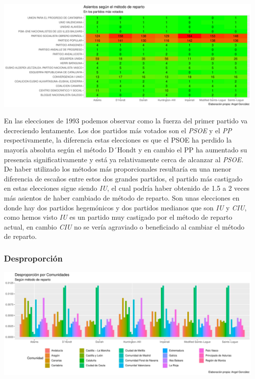 \documentclass[12pt,a4paper,]{book}
\numberwithin{dummy}{section}
\theoremstyle{ocrenumbox}
\theoremstyle{blacknumex}
\theoremstyle{blacknumbox}
\theoremstyle{ocrenum}
\theoremstyle{ocrenum}
\begin{document}
\begin{center}\includegraphics[width=0.95\linewidth]{figurasR/unnamed-chunk-107-2} \end{center}

En las elecciones de 1993 podemos observar como la fuerza del primer
partido va decreciendo lentamente. Los dos partidos más votados son el
\emph{PSOE} y el \emph{PP} respectivamente, la diferencia estas
elecciones es que el PSOE ha perdido la mayoría absoluta según el método
D´Hondt y en cambio el PP ha aumentado su presencia significativamente y
está ya relativamente cerca de alcanzar al \emph{PSOE.} De haber
utilizado los métodos más proporcionales resultaría en una menor
diferencia de escaños entre estos dos grandes partidos, el partido más
castigado en estas elecciones sigue siendo \emph{IU}, el cual podría
haber obtenido de 1.5 a 2 veces más asientos de haber cambiado de método
de reparto. Son unas elecciones en donde hay dos partidos hegemónicos y
dos partidos medianos que son \emph{IU} y \emph{CIU}, como hemos visto
\emph{IU} es un partido muy castigado por el método de reparto actual,
en cambio \emph{CIU} no se vería agraviado o beneficiado al cambiar el
método de reparto.

\hypertarget{desproporciuxf3n-5}{%
\subsubsection{Desproporción}\label{desproporciuxf3n-5}}

\begin{center}\includegraphics[width=0.95\linewidth]{figurasR/unnamed-chunk-108-1} \end{center}
\end{document}
